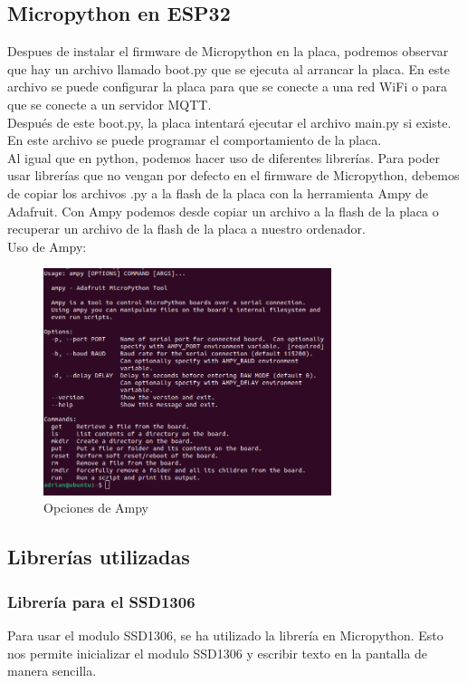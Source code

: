 \begin{titlepage}
\subsection{Micropython en ESP32}
Despues de instalar el firmware de Micropython en la placa, podremos observar que hay un archivo llamado boot.py que se ejecuta al arrancar la placa. En este archivo se puede configurar la placa para que se conecte a una red WiFi o para que se conecte a un servidor MQTT.\\
Después de este boot.py, la placa intentará ejecutar el archivo main.py si existe. En este archivo se puede programar el comportamiento de la placa.\\

Al igual que en python, podemos hacer uso de diferentes librerías. Para poder usar librerías que no vengan por defecto en el firmware de Micropython, debemos de copiar los archivos .py a la flash de la placa con la herramienta Ampy de Adafruit\cite{ref20}. Con Ampy podemos desde copiar un archivo a la flash de la placa o recuperar un archivo de la flash de la placa a nuestro ordenador. \\
Uso de Ampy:
\begin{figure}[h!]
	\centering
	\includegraphics[width=0.75\textwidth]{imagenes/ampy.png}
	\caption{Opciones de Ampy}
\end{figure}
\subsection{Librerías utilizadas}
\subsubsection{Librería para el SSD1306}
Para usar el modulo SSD1306, se ha utilizado la librería \cite{ref21} en Micropython. Esto nos permite inicializar el modulo SSD1306 y escribir texto en la pantalla de manera sencilla.\\

\end{titlepage}
